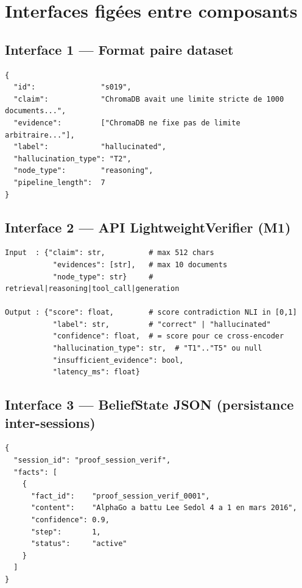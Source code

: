 \documentclass[12pt,a4paper]{article}
\begin{document}
\appendix

\section{Interfaces figées entre composants}

\subsection{Interface 1 --- Format paire dataset}

\begin{lstlisting}[language={}]
{
  "id":               "s019",
  "claim":            "ChromaDB avait une limite stricte de 1000 documents...",
  "evidence":         ["ChromaDB ne fixe pas de limite arbitraire..."],
  "label":            "hallucinated",
  "hallucination_type": "T2",
  "node_type":        "reasoning",
  "pipeline_length":  7
}
\end{lstlisting}

\subsection{Interface 2 --- API LightweightVerifier (M1)}

\begin{lstlisting}[language={}]
Input  : {"claim": str,          # max 512 chars
           "evidences": [str],   # max 10 documents
           "node_type": str}     # retrieval|reasoning|tool_call|generation

Output : {"score": float,        # score contradiction NLI in [0,1]
           "label": str,         # "correct" | "hallucinated"
           "confidence": float,  # = score pour ce cross-encoder
           "hallucination_type": str,  # "T1".."T5" ou null
           "insufficient_evidence": bool,
           "latency_ms": float}
\end{lstlisting}

\subsection{Interface 3 --- BeliefState JSON (persistance inter-sessions)}

\begin{lstlisting}[language={}]
{
  "session_id": "proof_session_verif",
  "facts": [
    {
      "fact_id":    "proof_session_verif_0001",
      "content":    "AlphaGo a battu Lee Sedol 4 a 1 en mars 2016",
      "confidence": 0.9,
      "step":       1,
      "status":     "active"
    }
  ]
}
\end{lstlisting}
\end{document}

